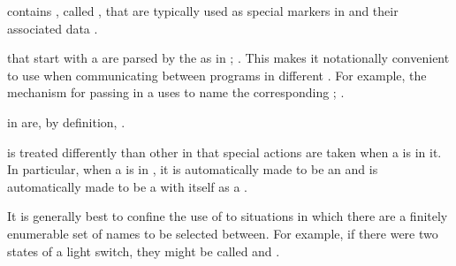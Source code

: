 
 contains , called ,
that are typically used as special markers in  
and their associated data .

  that start with a  
are parsed by the  as  
in ; \seesection\SymbolTokens.
This makes it notationally convenient to use 
when communicating between programs in different .  
For example, the mechanism for passing  in a  uses 
 to name the corresponding ;
\seesection\OrdinaryLambdaLists.

 in  are, by definition, .


 is treated differently than other 
in that special actions are taken when a  is  in it.
In particular, when a  is  in ,
 it is automatically made to be an  
and is automatically made to be a  with itself as a .


\endsubsubsubsection%



It is generally best to confine the use of  to situations in which
there are a finitely enumerable set of names to be selected between.  For example,
if there were two states of a light switch, they might be called  and .

